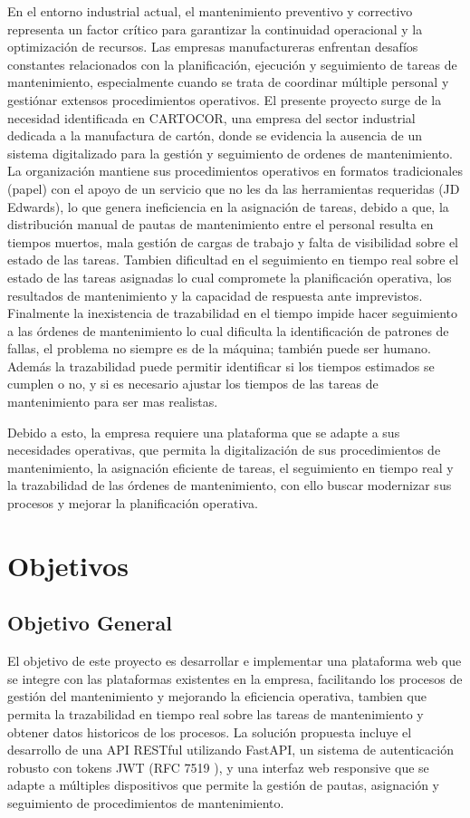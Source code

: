\documentclass[12pt,a4paper]{report}
\begin{document}
En el entorno industrial actual, el mantenimiento preventivo y correctivo representa un factor crítico para garantizar la continuidad operacional y la optimización de recursos. Las empresas manufactureras enfrentan desafíos constantes relacionados con la planificación, ejecución y seguimiento de tareas de mantenimiento, especialmente cuando se trata de coordinar múltiple personal y gestiónar extensos procedimientos operativos.
El presente proyecto surge de la necesidad identificada en CARTOCOR, una empresa del sector industrial dedicada a la manufactura de cartón, donde se evidencia la ausencia de un sistema digitalizado para la gestión y seguimiento de ordenes de mantenimiento. La organización mantiene sus procedimientos operativos en formatos tradicionales (papel) con el apoyo de un servicio que no les da las herramientas requeridas (JD Edwards), lo que genera ineficiencia en la asignación de tareas, debido a que, la distribución manual de pautas de mantenimiento entre el personal resulta en tiempos muertos, mala gestión de cargas de trabajo y falta de visibilidad sobre el estado de las tareas. Tambien dificultad en el seguimiento en tiempo real sobre el estado de las tareas asignadas lo cual compromete la planificación operativa, los resultados de mantenimiento y la capacidad de respuesta ante imprevistos. Finalmente la inexistencia de trazabilidad en el tiempo impide hacer seguimiento a las órdenes de mantenimiento lo cual dificulta la identificación de patrones de fallas, el problema no siempre es de la máquina; también puede ser humano. Además la trazabilidad puede permitir identificar si los tiempos estimados se cumplen o no, y si es necesario ajustar los tiempos de las tareas de mantenimiento para ser mas realistas.

Debido a esto, la empresa requiere una plataforma que se adapte a sus necesidades operativas, que permita la digitalización de sus procedimientos de mantenimiento, la asignación eficiente de tareas, el seguimiento en tiempo real y la trazabilidad de las órdenes de mantenimiento, con ello buscar modernizar sus procesos y mejorar la planificación operativa.


\chapter*{Objetivos}

\section*{Objetivo General}
El objetivo de este proyecto es desarrollar e implementar una plataforma web que se integre con las plataformas existentes en la empresa, facilitando los procesos de gestión del mantenimiento y mejorando la eficiencia operativa, tambien que permita la trazabilidad en tiempo real sobre las tareas de mantenimiento y obtener datos historicos de los procesos. La solución propuesta incluye el desarrollo de una API RESTful utilizando FastAPI, un sistema de autenticación robusto con tokens JWT (RFC 7519 \cite{rfc7519}), y una interfaz web responsive que se adapte a múltiples dispositivos que permite la gestión de pautas, asignación y seguimiento de procedimientos de mantenimiento.
\newpage
\end{document}
